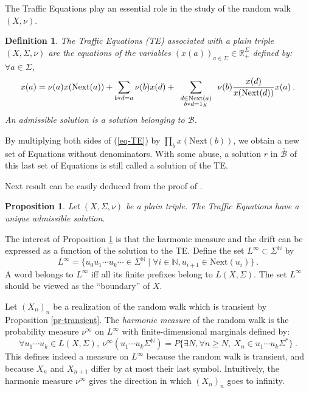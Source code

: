 \documentclass[11pt,a4paper]{article}
\newcommand{\bdl}[2]
{\mbox{$
\renewcommand{\arraystretch}{0.5}
\begin{array}{c}{\scriptstyle #1}\\ {\scriptstyle #2} \end{array}
\renewcommand{\arraystretch}{2}
       $}}
\newtheorem{proposition}[theorem]{Proposition}
\newtheorem{definition}[theorem]{Definition}
\theoremstyle{remark}
\def\Blackboardfont{\mathbb}
\def\rig{\text{Next}}
\def\lef{\text{Next}}
\def\cb{\cB}
\def\closcb{\bar{\cB}}
\def\N{{\Blackboardfont N}}
\def\R{{\Blackboardfont R}}
\def\cB{{\mathcal B}}
\def\eref#1{(\ref{#1})}
\begin{document}
The Traffic Equations play an essential role in the study of the
random walk $(X,\nu)$.

\begin{definition}\label{de-TE}
The {\em Traffic Equations (TE)} associated with a plain triple
$(X,\Sigma,\nu)$ are the equations of the variables $(x(a))_{a\in
\Sigma}\in \R_+^{\Sigma}$ defined by: $\forall a\in \Sigma$,
\begin{equation}\label{eq-TE}
x(a)  =  \nu(a)x(\rig(a)) + \sum_{b\ast d = a} \nu(b)x(d)  +
\sum_{\bdl{d\in \lef(a)}{b\ast d=1_X}} \nu(b)
\frac{x(d)}{x(\rig(d))} x(a) \:.
\end{equation}
An {\em admissible solution} is a solution belonging to  $\cb$.
\end{definition}

By multiplying both sides of \eref{eq-TE} by $\prod_b x(\rig(b))$,
we obtain a new set of Equations without denominators. With some
abuse, a solution $r$ in $\closcb$ of this last set of Equations
is still called a solution of the TE.

Next result can be easily deduced from the proof of \cite[Theorem
  4.5]{mair04}.

\begin{proposition}\label{pr-solTE}
Let $(X,\Sigma,\nu)$ be a plain triple. The Traffic Equations have
a unique admissible solution.
\end{proposition}


The interest of Proposition \ref{pr-solTE} is that the harmonic
measure and the drift can be expressed as a function of the
solution to the TE.
Define the set
$L^{\infty}\subset \Sigma^{\N}$ by
\begin{equation}\label{eq-Linfty}
L^{\infty}= \{u_0u_1\cdots u_k \cdots  \in \Sigma^{\N} \mid \forall i
\in \N, u_{i+1}\in \rig(u_i) \}\:.
\end{equation}
A word belongs to $L^{\infty}$ iff all its finite prefixes belong to
$L(X,\Sigma)$. The set $L^{\infty}$ should be viewed as the
``boundary'' of $X$.

\medskip

Let $(X_n)_n$ be a
realization of the random walk which is transient by Proposition
\ref{pr-transient}. 
The {\em harmonic measure} of the random walk is the probability
measure $\nu^{\infty}$ on $L^{\infty}$ with finite-dimensional marginals defined by:
\[
\forall u_1\cdots u_k \in L(X,\Sigma), \
\nu^{\infty}(u_1\cdots u_k\Sigma^{\N}) = P \{ \exists N, \forall n\geq
N, \ X_n \in u_1\cdots u_k\Sigma^* \}\:.
\]
This defines indeed a measure on $L^{\infty}$ because the random walk
is transient, and because $X_n$ and $X_{n+1}$ differ by at
most their last symbol.
Intuitively, the harmonic measure $\nu^{\infty}$ gives the direction in which $(X_n)_n$
goes to infinity.
\end{document}
